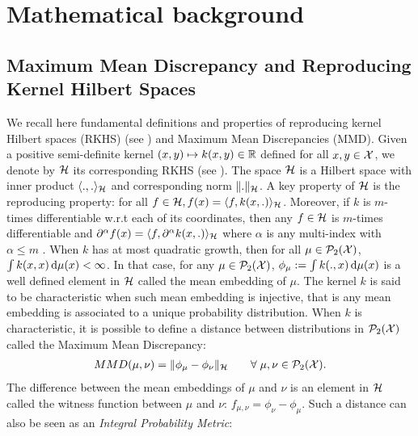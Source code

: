 


\section{Mathematical background}

\subsection{Maximum Mean Discrepancy and Reproducing Kernel Hilbert Spaces}\label{sec:rkhs}
We recall here fundamental definitions and properties of reproducing kernel Hilbert spaces (RKHS) (see \cite{smola1998learning}) and Maximum Mean Discrepancies (MMD). 
Given a positive semi-definite kernel $(x,y)\mapsto k(x,y)\in {{\mathbb R}}$ defined for all $x,y\in{{\mathcal X}}$, we denote by ${{\mathcal H}}$ its corresponding RKHS (see \cite{smola1998learning}). The space ${{\mathcal H}}$ is a Hilbert space with inner product $\langle .,. \rangle_{{{\mathcal H}}}$ and corresponding norm $\Vert . \Vert_{{{\mathcal H}}}$. A key property of ${{\mathcal H}}$ is the reproducing property: for all $f \in {{\mathcal H}}, f(x) = \langle f, k(x, .)\rangle_{{{\mathcal H}}}$. Moreover, if $k$ is $m$-times differentiable w.r.t each of its coordinates, then any $f\in {{\mathcal H}}$  is $m$-times differentiable  and $\partial^{\alpha}f(x)=\langle f, \partial^{\alpha} k(x,.) \rangle_{{{\mathcal H}}}$ where $\alpha$ is any multi-index with $\alpha \leq m$ \cite[Lemma 4.34]{Steinwart:2008a}. When $k$ has at most quadratic growth, then for all $\mu\in \mathcal{P}_2({{\mathcal X}})$, $\int k(x,x) \mathop{}\!\mathrm{d} \mu(x) <\infty$. In that case, for any $\mu\in \mathcal{P}_2({{\mathcal X}})$,  $ \phi_{\mu} := \int k(.,x)\mathop{}\!\mathrm{d} \mu(x)$ is a well defined element in ${{\mathcal H}}$ called the mean embedding of $\mu$. The kernel $k$ is said to be characteristic when such mean embedding is injective, that is any mean embedding is associated to a unique probability distribution. When $k$ is characteristic, it is possible to define a distance between distributions in $\mathcal{P}_2({{\mathcal X}})$ called the Maximum Mean Discrepancy:
\begin{align}
	MMD(\mu,\nu) = \Vert \phi_{\mu} - \phi_{\nu}\Vert_{{{\mathcal H}}} \qquad \forall \; \mu,\nu \in \mathcal{P}_2({{\mathcal X}}).
\end{align}
The difference between the mean embeddings of $\mu$ and $\nu$ is an element in ${{\mathcal H}}$ called the witness function between $\mu$ and $\nu$:  $f_{\mu,\nu} = \phi_{\nu} - \phi_{\mu}$. Such a distance can also be seen as an \textit{Integral Probability Metric}:
